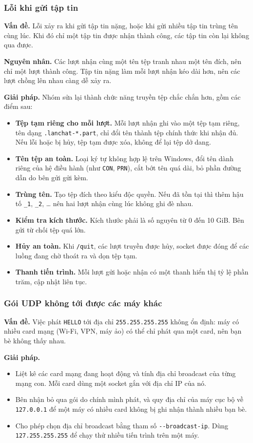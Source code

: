 \documentclass[a4paper,12pt]{article}
\newcommand{\code}[1]{\texttt{#1}}
\begin{document}
\subsubsection{Lỗi khi gửi tập tin}
\textbf{Vấn đề.} Lỗi xảy ra khi gửi tập tin nặng, hoặc khi gửi nhiều tập tin trùng tên cùng lúc. Khi đó chỉ một tập tin được nhận thành công, các tập tin còn lại không qua được.

\textbf{Nguyên nhân.} Các lượt nhận cùng một tên tệp tranh nhau một tên đích, nên chỉ một lượt thành công. Tập tin nặng làm mỗi lượt nhận kéo dài hơn, nên các lượt chồng lên nhau càng dễ xảy ra.

\textbf{Giải pháp.} Nhóm sửa lại thành chức năng truyền tệp chắc chắn hơn, gồm các điểm sau:
\begin{itemize}
\item \textbf{Tệp tạm riêng cho mỗi lượt.} Mỗi lượt nhận ghi vào một tệp tạm riêng, tên dạng \code{.lanchat-*.part}, chỉ đổi tên thành tệp chính thức khi nhận đủ. Nếu lỗi hoặc bị hủy, tệp tạm được xóa, không để lại tệp dở dang.
\item \textbf{Tên tệp an toàn.} Loại ký tự không hợp lệ trên Windows, đổi tên dành riêng của hệ điều hành (như \code{CON}, \code{PRN}), cắt bớt tên quá dài, bỏ phần đường dẫn do bên gửi gửi kèm.
\item \textbf{Trùng tên.} Tạo tệp đích theo kiểu độc quyền. Nếu đã tồn tại thì thêm hậu tố \code{\_1}, \code{\_2}, \ldots{} nên hai lượt nhận cùng lúc không ghi đè nhau.
\item \textbf{Kiểm tra kích thước.} Kích thước phải là số nguyên từ 0 đến 10 GiB. Bên gửi từ chối tệp quá lớn.
\item \textbf{Hủy an toàn.} Khi \code{/quit}, các lượt truyền được hủy, socket được đóng để các luồng đang chờ thoát ra và dọn tệp tạm.
\item \textbf{Thanh tiến trình.} Mỗi lượt gửi hoặc nhận có một thanh hiển thị tỷ lệ phần trăm, cập nhật liên tục.
\end{itemize}

\subsubsection{Gói UDP không tới được các máy khác}
\textbf{Vấn đề.} Việc phát \code{HELLO} tới địa chỉ \code{255.255.255.255} không ổn định: máy có nhiều card mạng (Wi-Fi, VPN, máy ảo) có thể chỉ phát qua một card, nên bạn bè không thấy nhau.

\textbf{Giải pháp.}
\begin{itemize}
\item Liệt kê các card mạng đang hoạt động và tính địa chỉ broadcast của từng mạng con. Mỗi card dùng một socket gắn với địa chỉ IP của nó.
\item Bên nhận bỏ qua gói do chính mình phát, và quy địa chỉ của máy cục bộ về \code{127.0.0.1} để một máy có nhiều card không bị ghi nhận thành nhiều bạn bè.
\item Cho phép chọn địa chỉ broadcast bằng tham số \code{-{}-broadcast-ip}. Dùng \code{127.255.255.255} để chạy thử nhiều tiến trình trên một máy.
\end{itemize}
\end{document}
